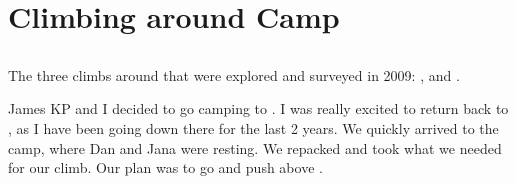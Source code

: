 \section{Climbing around Camp}

\subsection{\protect{}}



\begin{pagesurvey}
\centering
{}
\caption[2009  climbs]{The three climbs around  that were explored and surveyed in 2009: ,  and .} \label{camp climbs}
\end{pagesurvey}

James KP and I decided to go camping to . I was really
excited to return back to , as I have been going
down there for the last 2 years. We quickly arrived to the camp, where
Dan and Jana were resting. We repacked and took what we needed for our
climb. Our plan was to go and push above .

